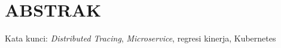 \clearpage
\chapter*{ABSTRAK}



\vspace{15mm}
Kata kunci: \textit{Distributed Tracing}, \textit{Microservice}, regresi kinerja, Kubernetes
\clearpage